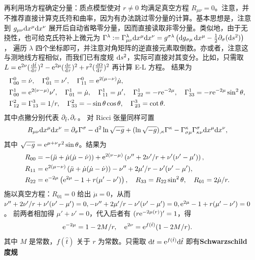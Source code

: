 再利用场方程确定分量：质点模型使对 $r\ne 0$ 均满足真空方程 $R_{\mu\nu}=0$。注意，并不推荐直接计算克氏符和曲率，因为有办法跳过零分量的计算。基本思想是，注意到 $g_{\mu\nu}\dd x^\mu\dd x^\nu$ 展开后自动省略零分量，因而直接读取非零分量。类似地，由于无挠性，也可给克氏符补上微元为
$\Gamma^\lambda:=\Gamma^\lambda_{\mu\nu}\dd x^\mu\dd x^\nu=g^{\sigma\lambda}\left(\dd g_{\sigma\mu}\,\dd x^\mu- \frac{1}{2} \partial_\sigma(\dd s^2)\right)$，
遍历 $\lambda$ 四个坐标即可，并注意对角矩阵的逆直接元素取倒数。亦或者，注意这与测地线方程相似，而我们已有度规 $\dd s^2$，实际可直接对其变分。比如，只需取 $L=\mathrm{e}^{2\nu}(\dv{\hat t}{\tau})^2-\mathrm{e}^{2\mu}(\dv{r}{\tau})^2+r^2(\dv{\Omega}{\tau})^2$ 再计算 E-L 方程。
结果为
\begin{align*}
    & \Gamma_{00}^0=\dot{\nu}, \quad \Gamma_{01}^0=\nu^{\prime}, \quad \Gamma_{11}^0=\mathrm{e}^{2(\mu-\nu)} \dot{\mu}, \\& \Gamma_{00}^1=\mathrm{e}^{2(\nu-\mu)} \nu^{\prime}, \quad \Gamma_{01}^1=\dot{\mu}, \quad \Gamma_{11}^1=\mu^{\prime}, \quad \Gamma_{22}^1=-r \mathrm{e}^{-2 \mu}, \quad \Gamma_{33}^1=-r \mathrm{e}^{-2 \mu} \sin ^2 \theta, \\
    & \Gamma_{12}^2=\Gamma_{13}^3={1}/{r}, \quad \Gamma_{33}^2=-\sin \theta \cos \theta, \quad \Gamma_{23}^3=\cot \theta.
\end{align*}
其中点撇分别代表 $\partial_{\hat t},\partial_{r}$。
对 Ricci 张量同样可置
\[R_{\mu\nu}\dd x^\mu\dd x^\nu=\partial_\sigma\Gamma^\sigma-\dd^2\ln\sqrt{-g}+(\ln\sqrt{-g})_{,\kappa}\Gamma^\kappa-\Gamma^\kappa_{\sigma\mu}\Gamma^\sigma_{\kappa\nu}\dd x^\mu\dd x^\nu,\]
其中 $\sqrt{-g}=\mathrm{e}^{\mu+\nu}r^2\sin\theta$。结果为
\begin{align*}
    R_{00} &= -(\ddot\mu+\dot\mu(\dot\mu-\dot\nu))+\mathrm{e}^{2(\nu-\mu)} \left(\nu''+2\nu'/r+\nu'(\nu'-\mu')\right), \\
    R_{11} &= \mathrm{e}^{2(\mu-\nu)} \left(\ddot\mu+\dot\mu(\dot\mu-\dot\nu)\right)-\nu''+2\mu'/r-\nu'(\nu'-\mu'), \\
    R_{22} &= \mathrm{e}^{-2\mu} \left(\mathrm{e}^{2\mu}-1+r(\mu'-\nu')\right), \quad R_{33} = R_{22} \sin ^2 \theta,\quad R_{01} = 2\dot\mu/r.
\end{align*}
施以真空方程：$R_{01}=0$ 给出 $\dot\mu=0$，从而
$\nu''+2\nu'/r+\nu'(\nu'-\mu')=0, 
-\nu''+2\mu'/r-\nu'(\nu'-\mu')=0, 
\mathrm{e}^{2\mu}-1+r(\mu'-\nu')=0$。
前两者相加得 $\mu'+\nu'=0$，代入后者有 $(r\mathrm{e}^{-2\mu(r)})'=1$，得
\[\mathrm{e}^{-2\mu}=1-{2M}/{r},\quad \mathrm{e}^{2\nu}=\mathrm{e}^{f(\hat t)}(1-{2M}/{r}).\]
其中 $M$ 是常数，$f(\hat t)$ 关于 $r$ 为常数。只需取 $\dd t=\mathrm{e}^{f(\hat t)}\dd\hat t$ 即有\textbf{Schwarzschild 度规}
